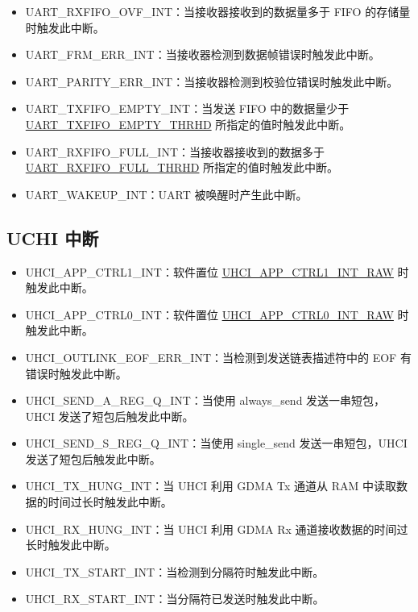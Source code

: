 \documentclass[main\_\_CN.tex]{subfiles}
\begin{document}
\begin{itemize}
\item \label{int:UARTRXFIFOOVFINT}UART\_RXFIFO\_OVF\_INT：当接收器接收到的数据量多于 FIFO 的存储量时触发此中断。
\item \label{int:UARTFRMERRINT}UART\_FRM\_ERR\_INT：当接收器检测到数据帧错误时触发此中断。 
\item \label{int:UARTPARITYERRINT}UART\_PARITY\_ERR\_INT：当接收器检测到校验位错误时触发此中断。
\item \label{int:UARTTXFIFOEMPTYINT}UART\_TXFIFO\_EMPTY\_INT：当发送 FIFO 中的数据量少于 \hyperref[fielddesc:UARTTXFIFOEMPTYTHRHD]{UART\_TXFIFO\_EMPTY\_THRHD} 所指定的值时触发此中断。
\item \label{int:UARTRXFIFOFULLINT}UART\_RXFIFO\_FULL\_INT：当接收器接收到的数据多于 \hyperref[fielddesc:UARTRXFIFOFULLTHRHD]{UART\_RXFIFO\_FULL\_THRHD} 所指定的值时触发此中断。
\item \label{int:UARTWAKEUPINT}UART\_WAKEUP\_INT：UART 被唤醒时产生此中断。
\end{itemize}

\subsection{UCHI 中断}
\begin{itemize}
\item \label{int:UHCIAPPCTRL1INT}UHCI\_APP\_CTRL1\_INT：软件置位 \hyperref[fielddesc:UHCIAPPCTRL1INTRAW]{UHCI\_APP\_CTRL1\_INT\_RAW} 时触发此中断。
\item \label{int:UHCIAPPCTRL0INT}UHCI\_APP\_CTRL0\_INT：软件置位 \hyperref[fielddesc:UHCIAPPCTRL0INTRAW]{UHCI\_APP\_CTRL0\_INT\_RAW} 时触发此中断。
\item \label{int:UHCIOUTLINKEOFERRINT}UHCI\_OUTLINK\_EOF\_ERR\_INT：当检测到发送链表描述符中的 EOF 有错误时触发此中断。
\item \label{int:UHCISENDAREGQINT}UHCI\_SEND\_A\_REG\_Q\_INT：当使用 always\_send 发送一串短包，UHCI 发送了短包后触发此中断。
\item \label{int:UHCISENDSREGQINT}UHCI\_SEND\_S\_REG\_Q\_INT：当使用 single\_send 发送一串短包，UHCI 发送了短包后触发此中断。
\item \label{int:UHCITXHUNGINT}UHCI\_TX\_HUNG\_INT：当 UHCI 利用 GDMA Tx 通道从 RAM 中读取数据的时间过长时触发此中断。
\item \label{int:UHCIRXHUNGINT}UHCI\_RX\_HUNG\_INT：当 UHCI 利用 GDMA Rx 通道接收数据的时间过长时触发此中断。
\item \label{int:UHCITXSTARTINT}UHCI\_TX\_START\_INT：当检测到分隔符时触发此中断。
\item \label{int:UHCIRXSTARTINT}UHCI\_RX\_START\_INT：当分隔符已发送时触发此中断。
\end{itemize}
\end{document}
